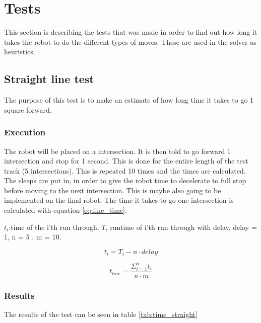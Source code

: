 \documentclass[a4paper,10pt]{article}
\begin{document}
\section{Tests}
This section is describing the tests that was made in order to find out how long it takes the robot to do the different types of moves.
These are used in the solver as heuristics.

\subsection{Straight line test} \label{sec:line_time}
The purpose of this test is to make an estimate of how long time it takes to go 1 square forward. 

\subsubsection{Execution}
The robot will be placed on a intersection. It is then told to go forward 1 intersection and stop for 1 second. This is done for the entire length of the test track (5 intersections). This is repeated 10 times and the times are calculated. The sleeps are put in, in order to give the robot time to decelerate to full stop before moving to the next intersection. This is maybe also going to be implemented on the final robot. The time it takes to go one intersection is calculated with equation \ref{eq:line_time}. 

$t_i$:time of the i'th run through, $T_i$ runtime of i'th run through with delay, delay = 1, n = 5 , m = 10.

\begin{equation} \label{eq:t_no_delay}
t_i = T_i - n\cdot delay
\end{equation}

\begin{equation}\label{eq:line_time}
 t_{line} =\frac{ \Sigma_{i=1}^n t_i}{n\cdot m}
\end{equation}

\subsubsection{Results}
The results of the test can be seen in table \ref{tab:time_straight}
\end{document}
